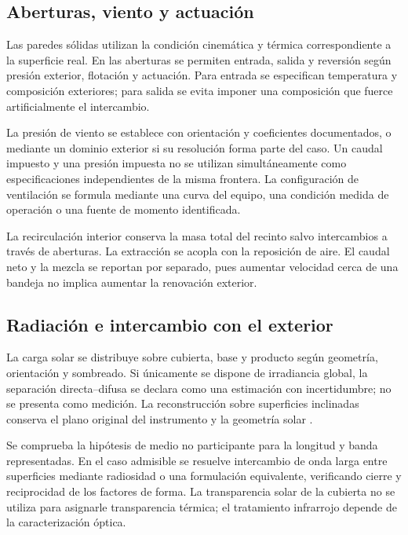 \subsection{Aberturas, viento y actuación}

Las paredes sólidas utilizan la condición cinemática y térmica correspondiente a la superficie real. En las aberturas se permiten entrada, salida y reversión según presión exterior, flotación y actuación. Para entrada se especifican temperatura y composición exteriores; para salida se evita imponer una composición que fuerce artificialmente el intercambio.

La presión de viento se establece con orientación y coeficientes documentados, o mediante un dominio exterior si su resolución forma parte del caso. Un caudal impuesto y una presión impuesta no se utilizan simultáneamente como especificaciones independientes de la misma frontera. La configuración de ventilación se formula mediante una curva del equipo, una condición medida de operación o una fuente de momento identificada.

La recirculación interior conserva la masa total del recinto salvo intercambios a través de aberturas. La extracción se acopla con la reposición de aire. El caudal neto y la mezcla se reportan por separado, pues aumentar velocidad cerca de una bandeja no implica aumentar la renovación exterior.

\subsection{Radiación e intercambio con el exterior}

La carga solar se distribuye sobre cubierta, base y producto según geometría, orientación y sombreado. Si únicamente se dispone de irradiancia global, la separación directa--difusa se declara como una estimación con incertidumbre; no se presenta como medición. La reconstrucción sobre superficies inclinadas conserva el plano original del instrumento y la geometría solar \cite{duffie2013,reda2004}.

Se comprueba la hipótesis de medio no participante para la longitud y banda representadas. En el caso admisible se resuelve intercambio de onda larga entre superficies mediante radiosidad o una formulación equivalente, verificando cierre y reciprocidad de los factores de forma. La transparencia solar de la cubierta no se utiliza para asignarle transparencia térmica; el tratamiento infrarrojo depende de la caracterización óptica.

